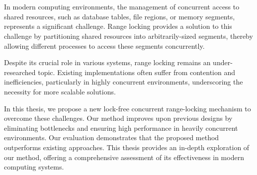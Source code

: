 \chapter{\abstractname}

In modern computing environments, the management of concurrent access to shared resources, such as database tables, file regions, or memory segments, represents a significant challenge. 
Range locking provides a solution to this challenge by partitioning shared resources into arbitrarily-sized segments, thereby allowing different processes to access these segments concurrently.

Despite its crucial role in various systems, range locking remains an under-researched topic. 
Existing implementations often suffer from contention and inefficiencies, particularly in highly concurrent environments, underscoring the necessity for more scalable solutions.

In this thesis, we propose a new lock-free concurrent range-locking mechanism to overcome these challenges. 
Our method improves upon previous designs by eliminating bottlenecks and ensuring high performance in heavily concurrent environments. 
Our evaluation demonstrates that the proposed method outperforms existing approaches. 
This thesis provides an in-depth exploration of our method, offering a comprehensive assessment of its effectiveness in modern computing systems.